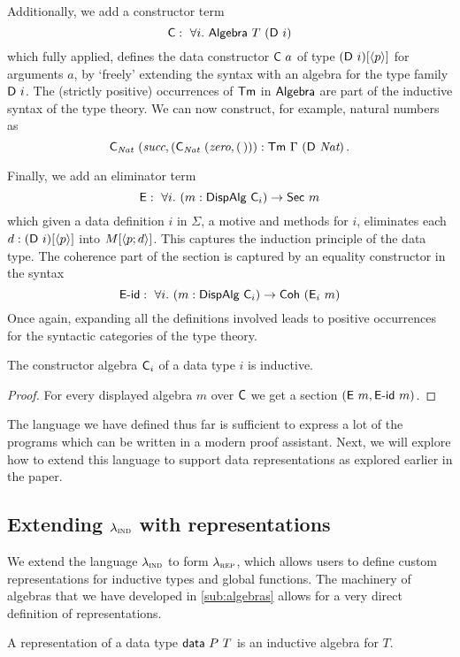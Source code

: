 Additionally, we add a constructor term
\[
	\mta{C} :\ \forall i.\ \mta{Algebra}\ T\ (\mta{D}\ i)
\]
which fully applied, defines the data constructor $\textsf{C}\ a$ of type
$(\textsf{D}\ i)[\langle p\rangle]$ for arguments $a$, by `freely' extending the syntax with
an algebra for the type family $\textsf{D}\ i$. The (strictly positive) occurrences
of $\textsf{Tm}$ in $\textsf{Algebra}$ are part of the inductive syntax of the type
theory. We can now construct, for example, natural numbers as
\[
    \mta{C}_{\textit{Nat}}\ (\textit{succ}, (\mta{C}_{\textit{Nat}}\ (\textit{zero}, (\,))) : \mta{Tm}\ \Gamma\ (\mta{D}\ \textit{Nat}) \,.
\]

Finally, we add an eliminator term
\[
	\mta{E} :\ \forall i.\ (m : \mta{DispAlg}\ \mta{C}_i) \to \mta{Sec}\ m
\]
which given a data definition $i$ in $\Sigma$, a motive and methods for $i$,
eliminates each $d : (\textsf{D}\ i)[\langle p\rangle]$ into $M[\langle p;d\rangle]$. This captures
the induction principle of the data type. The coherence part of the section is
captured by an equality constructor in the syntax
\[
	\mta{E-id} :\ \forall i.\ (m : \mta{DispAlg}\ \mta{C}_i) \to \mta{Coh}\ (\mta{E}_i\ m)
\]
Once again, expanding all the definitions involved leads to positive occurrences for
the syntactic categories of the type theory.
\begin{lemma}
	The constructor algebra $\textsf{C}_i$ of a data type $i$ is inductive.
	\begin{proof}
		For every displayed algebra $m$ over $\textsf{C}$ we get a section $(\textsf{E}\ m, \textsf{E-id}\ m)$.
	\end{proof}
\end{lemma}

The language we have defined thus far is sufficient to express a lot of the
programs which can be written in a modern proof assistant. Next, we will explore
how to extend this language to support data representations as explored earlier
in the paper.

\subsection{Extending $\lambda_{\textsc{ind}}$ with representations} \label{sub:lambdarep}

We extend the language $\lambda_{\textsc{ind}}$ to form $\lambda_{\textsc{rep}}$, which allows users to
define custom representations for inductive types and global functions. The
machinery of algebras that we have developed in \cref{sub:algebras} allows for a
very direct definition of representations.

\begin{definition}
	A representation of a data type $\textsf{data}\ P\ T$ is an inductive algebra for $T$.
\end{definition}

